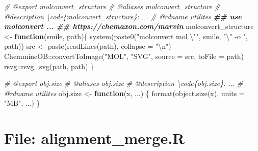 \documentclass[
]{article}
\newenvironment{Shaded}{\begin{snugshade}}{\end{snugshade}}
\newcommand{\AttributeTok}[1]{\textcolor[rgb]{0.77,0.63,0.00}{#1}}
\newcommand{\CommentTok}[1]{\textcolor[rgb]{0.56,0.35,0.01}{\textit{#1}}}
\newcommand{\ControlFlowTok}[1]{\textcolor[rgb]{0.13,0.29,0.53}{\textbf{#1}}}
\newcommand{\DocumentationTok}[1]{\textcolor[rgb]{0.56,0.35,0.01}{\textbf{\textit{#1}}}}
\newcommand{\FunctionTok}[1]{\textcolor[rgb]{0.00,0.00,0.00}{#1}}
\newcommand{\NormalTok}[1]{#1}
\newcommand{\OtherTok}[1]{\textcolor[rgb]{0.56,0.35,0.01}{#1}}
\newcommand{\SpecialCharTok}[1]{\textcolor[rgb]{0.00,0.00,0.00}{#1}}
\newcommand{\StringTok}[1]{\textcolor[rgb]{0.31,0.60,0.02}{#1}}
\begin{document}
\begin{Shaded}
\begin{Highlighting}[]
\CommentTok{\#\textquotesingle{} @export molconvert\_structure}
\CommentTok{\#\textquotesingle{} @aliases molconvert\_structure}
\CommentTok{\#\textquotesingle{} @description \textbackslash{}code\{molconvert\_structure\}: ...}
\CommentTok{\#\textquotesingle{} @rdname utilites}
\DocumentationTok{\#\# use \textquotesingle{}molconvert\textquotesingle{} ...}
\DocumentationTok{\#\# https://chemaxon.com/marvin}
\NormalTok{molconvert\_structure }\OtherTok{\textless{}{-}}
  \ControlFlowTok{function}\NormalTok{(smile, path)\{}
    \FunctionTok{system}\NormalTok{(}\FunctionTok{paste0}\NormalTok{(}\StringTok{"molconvert mol }\SpecialCharTok{\textbackslash{}"}\StringTok{"}\NormalTok{, smile, }\StringTok{"}\SpecialCharTok{\textbackslash{}"}\StringTok{ {-}o "}\NormalTok{, path))}
\NormalTok{    src }\OtherTok{\textless{}{-}} \FunctionTok{paste}\NormalTok{(}\FunctionTok{readLines}\NormalTok{(path), }\AttributeTok{collapse =} \StringTok{"}\SpecialCharTok{\textbackslash{}n}\StringTok{"}\NormalTok{)}
\NormalTok{    ChemmineOB}\SpecialCharTok{::}\FunctionTok{convertToImage}\NormalTok{(}\StringTok{"MOL"}\NormalTok{, }\StringTok{"SVG"}\NormalTok{, }\AttributeTok{source =}\NormalTok{ src, }\AttributeTok{toFile =}\NormalTok{ path)}
\NormalTok{    rsvg}\SpecialCharTok{::}\FunctionTok{rsvg\_svg}\NormalTok{(path, path)}
\NormalTok{  \}}

\CommentTok{\#\textquotesingle{} @export obj.size}
\CommentTok{\#\textquotesingle{} @aliases obj.size}
\CommentTok{\#\textquotesingle{} @description \textbackslash{}code\{obj.size\}: ...}
\CommentTok{\#\textquotesingle{} @rdname utilites}
\NormalTok{obj.size }\OtherTok{\textless{}{-}} \ControlFlowTok{function}\NormalTok{(x, ...) \{}
  \FunctionTok{format}\NormalTok{(}\FunctionTok{object.size}\NormalTok{(x), }\AttributeTok{units =} \StringTok{"MB"}\NormalTok{, ...)}
\NormalTok{\}}
\end{Highlighting}
\end{Shaded}

\hypertarget{file-alignment_merge.r}{%
\section{File: alignment\_merge.R}\label{file-alignment_merge.r}}
\end{document}
